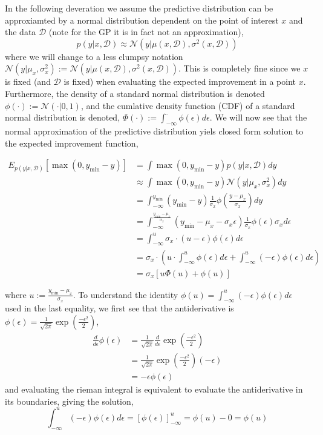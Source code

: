 In the following deveration
we assume the predictive distribution can be approxiamted by a normal distribution dependent on
the point of interest $x$ and the data $\mathcal{D}$ (note for the GP
it is in fact not an approximation), 
$$p(y|x,\mathcal{D}) \approx \mathcal{N}(y|\mu(x,\mathcal{D}), \sigma^2(x,\mathcal{D}))$$ where we
will change to a less clumpsy notation $\mathcal{N}(y|\mu_x,
\sigma^2_x):=\mathcal{N}(y|\mu(x,\mathcal{D}), \sigma^2(x,\mathcal{D}))$. This is completely fine
since we $x$ is fixed (and $\mathcal{D}$ is fixed) when evaluating the expected improvement in a point
$x$. %
Furthermore, the density of
a standard normal distribution is denoted $\phi(\cdot):=\mathcal{N}(\cdot | 0,1)$, and the cumlative
density function (CDF) of a standard normal distribution is denoted, $\Phi(\cdot) :=
\int_{-\infty}^{\cdot} \phi(\epsilon)d\epsilon$. We will now see that the normal approximation
of the predictive distribution yiels closed form solution to the expected improvement function, 

\begin{align*}
    E_{p(y|x,\mathcal{D})}[\max(0,y_{\min}-y)] &= \int \max(0,y_{\min}-y) p(y|x,\mathcal{D}) dy\\
    &\approx \int \max(0,y_{\min}-y) \mathcal{N}(y|\mu_x, \sigma_x^2) dy\\
    &= \int_{-\infty}^{y_{\min}} (y_{\min}-y) \frac{1}{\sigma_x}\phi\left(\frac{y-\mu_x}{\sigma_x}\right) dy\\
    &= \int_{-\infty}^{\frac{y_{\min}-\mu_x}{\sigma_x}} (y_{\min}-\mu_x-\sigma_x\epsilon) \frac{1}{\sigma_x}\phi\left(\epsilon\right) \sigma_x d\epsilon\\
    &= \int_{-\infty}^u \sigma_x \cdot (u-\epsilon) \phi(\epsilon) d\epsilon\\
    &=  \sigma_x \cdot \left( u\cdot \int_{-\infty}^u \phi(\epsilon) d\epsilon +\int_{-\infty}^u (-\epsilon)  \phi(\epsilon) d\epsilon \right) \\
    &= \sigma_x [u\Phi(u)+ \phi(u)]
\end{align*}

where $u:=\frac{y_{\min}-\mu_x}{\sigma_x}$. To understand the identity $\phi(u) = \int_{-\infty}^u
(-\epsilon)  \phi(\epsilon) d\epsilon$ used in the last equality, we first see that the antiderivative
is $\phi(\epsilon) = \frac{1}{\sqrt{2\pi}} \exp(\frac{-\epsilon^2}{2})$,
\begin{align*}
    \frac{d}{d \epsilon} \phi(\epsilon) &=  \frac{1}{\sqrt{2\pi}}\frac{d}{d \epsilon} \exp(\frac{-\epsilon^2}{2})\\
    &=  \frac{1}{\sqrt{2\pi}}\exp(\frac{-\epsilon^2}{2})(-\epsilon)\\
    &= -\epsilon \phi(\epsilon)
\end{align*}
and evaluating the rieman integral is equivalent to evaluate the antiderivative in its boundaries, giving the 
solution, 
$$\int_{-\infty}^u
(-\epsilon)  \phi(\epsilon) d\epsilon = \left[\phi(\epsilon)\right]_{-\infty}^u = \phi(u)-0 = \phi(u)$$ 

